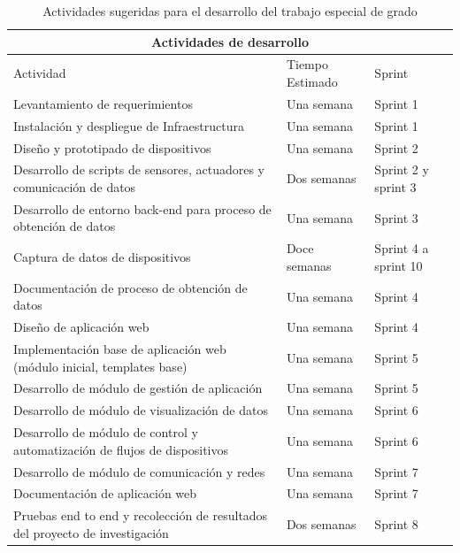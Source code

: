 \begin{table}[!htb]
\centering
\begin{tabular}{| m{6.5cm}| m{3.5cm}| m{4cm}|}
\hline
\multicolumn{3}{|c|}{Actividades de desarrollo} \\
\hline 
\centering Actividad & \centering Tiempo Estimado & \centering Sprint \tabularnewline \hline

Levantamiento de requerimientos & Una semana & Sprint 1 \\ \hline

Instalación y despliegue de Infraestructura & Una semana & Sprint 1 \\ \hline

Diseño y prototipado de dispositivos & Una semana & Sprint 2 \\ \hline

Desarrollo de scripts de sensores, actuadores y comunicación de datos & Dos semanas & Sprint 2 y sprint 3\\ \hline

Desarrollo de entorno back-end para proceso de obtención de datos & Una semana & Sprint 3  \\ \hline

Captura de datos de dispositivos & Doce semanas & Sprint 4 a sprint 10 \\ \hline

Documentación de proceso de obtención de datos & Una semana & Sprint 4 \\ \hline

Diseño de aplicación web & Una semana & Sprint 4 \\ \hline

Implementación base de aplicación web (módulo inicial, templates base) & Una semana & Sprint 5 \\ \hline

Desarrollo de módulo de gestión de aplicación & Una semana & Sprint 5 \\ \hline

Desarrollo de módulo de visualización de datos & Una semana & Sprint 6\\ \hline

Desarrollo de módulo de control y automatización de flujos de dispositivos & Una semana & Sprint 6\\ \hline

Desarrollo de módulo de comunicación y redes & Una semana & Sprint 7\\ \hline

Documentación de aplicación web & Una semana & Sprint 7\\ \hline

Pruebas end to end y recolección de resultados del proyecto de investigación & Dos semanas & Sprint 8\\ \hline

\end{tabular}
\caption{Actividades sugeridas para el desarrollo del trabajo especial de grado}
\label{tabla:actividades_desarrollo}
\end{table}
 